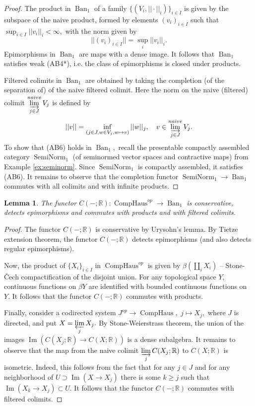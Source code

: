 \documentclass[11pt,leqno]{amsart}
\newtheorem{lemma}[theo]{Lemma}
\numberwithin{equation}{section}
\def\R{\mathbb{R}}
\newcommand{\indlim}[1][]{\mathop{\varinjlim}\limits_{#1}}
\newcommand{\prolim}[1][]{\mathop{\varprojlim}\limits_{#1}}
\newcommand{\comphaus}{\operatorname{CompHaus}}
\newcommand{\seminorm}{\operatorname{SemiNorm}}
\newcommand{\Ban}{\operatorname{Ban}}
\newcommand{\im}{\operatorname{Im}}
\begin{document}
\begin{proof}The product in $\Ban_1$ of a family $\{(V_i,||\cdot ||_i)\}_{i\in I}$ is given by the subspace of the naive product, formed by elements $(v_i)_{i\in I}$ such that $\sup_{i\in I}||v_i||_i<\infty,$ with the norm given by $$||(v_i)_{i\in I}||=\sup_i ||v_i||_i.$$ Epimorphisms in $\Ban_1$ are maps with a dense image. It follows that $\Ban_1$ satisfies weak (AB4*), i.e. the class of epimorphisms is closed under products. 

Filtered colimits in $\Ban_1$ are obtained by taking the completion (of the separation of) of the naive filtered colimit. Here the norm on the naive (filtered) colimit 
$\indlim[j\in J]^{naive}V_j$ is defined by $$||v||=\inf_{(j\in J,w\in V_j,w\mapsto v)}||w||_j,\quad v\in \indlim[j\in J]^{naive}V_j.$$
To show that (AB6) holds in $\Ban_1,$ recall the presentable compactly assembled category $\seminorm_1$ (of seminormed vector spaces and contractive maps) from Example \ref{ex:seminorm}. Since $\seminorm_1$ is compactly assembled, it satisfies (AB6). It remains to observe that the completion functor $\seminorm_1\to\Ban_1$ commutes with all colimits and with infinite products.\end{proof}

\begin{lemma}\label{lem:cont_functions_properties} The functor $C(-;\R):\comphaus^{op}\to\Ban_1$ is conservative, detects epimorphisms and commutes with products and with filtered colimits.\end{lemma}

\begin{proof} The functor $C(-;\R)$ is conservative by Urysohn's lemma. By Tietze extension theorem, the functor $C(-;\R)$ detects epimorphisms (and also detects regular epimorphisms).

Now, the product of $\{X_i\}_{i\in I}$ in $\comphaus^{op}$ is given by $\beta(\coprod_i X_i)$ -- Stone-\v{C}ech compactification of the disjoint union. For any topological space $Y,$ continuous functions on $\beta Y$ are identified with bounded continuous functions on $Y.$ It follows that the functor $C(-;\R)$ commutes with products.

Finally, consider a codirected system $J^{op}\to \comphaus,$ $j\mapsto X_j,$ where $J$ is directed, and put $X=\prolim[j]X_j.$ By Stone-Weierstrass theorem, the union of the images $\im(C(X_j;\R)\to C(X;\R))$ is a dense subalgebra. It remains to observe that the map from the naive colimit $\indlim[j] C(X_j;\R)$ to $C(X;\R)$ is isometric. Indeed, this follows from the fact that for any $j\in J$ and for any neighborhood of $U\supset \im(X\to X_j)$ there is some $k\geq j$ such that $\im(X_k\to X_j)\subset U.$ It follows that the functor $C(-;\R)$ commutes with filtered colimits.
\end{proof}
\end{document}
